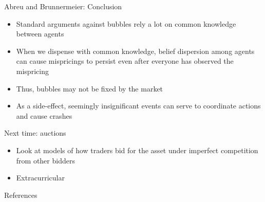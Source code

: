 \documentclass[english,10pt
,aspectratio=169
]{beamer}
\begin{document}
\begin{frame}{Abreu and Brunnermeier: Conclusion}
	\begin{itemize}
		\item Standard arguments against bubbles rely a lot on common knowledge between agents
		\item When we dispense with common knowledge, belief dispersion among agents can cause mispricings to persist even after everyone has observed the mispricing
		\item Thus, bubbles may not be fixed by the market
		\item As a side-effect, seemingly insignificant events can serve to coordinate actions and cause crashes
	\end{itemize}
\end{frame}


\begin{frame}{Next time: auctions}
	\begin{itemize}
		\item Look at models of how traders bid for the asset under imperfect competition from other bidders
		\item Extracurricular
	\end{itemize}
\end{frame}




\appendix
\begin{frame}[allowframebreaks]{References}
	
	
\end{frame}
\end{document}
